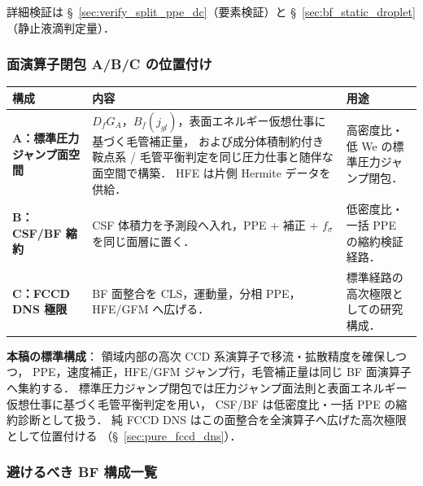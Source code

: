 詳細検証は §~\ref{sec:verify_split_ppe_dc}（要素検証）と
§~\ref{sec:bf_static_droplet}（静止液滴判定量）．

\subsubsection{面演算子閉包 A/B/C の位置付け}
\label{sec:fccd_bf_strategy_table}

\begin{center}
\begin{tabular}{@{}p{}p{}p{}@{}}
\hline
構成 & 内容 & 用途 \\
\hline
\textbf{A：標準圧力ジャンプ面空間} &
$D_fG_A$，$B_f(j_{gl})$，表面エネルギー仮想仕事に基づく毛管補正量，
および成分体積制約付き鞍点系 / 毛管平衡判定を同じ圧力仕事と随伴な面空間で構築．
HFE は片側 Hermite データを供給．
& 高密度比・低 We の標準圧力ジャンプ閉包．
\\
\textbf{B：CSF/BF 縮約} &
CSF 体積力を予測段へ入れ，PPE + 補正 + $f_\sigma$ を同じ面層に置く．
& 低密度比・一括 PPE の縮約検証経路．
\\
\textbf{C：FCCD DNS 極限} &
BF 面整合を CLS，運動量，分相 PPE，HFE/GFM へ広げる．
& 標準経路の高次極限としての研究構成．
\\
\hline
\end{tabular}
\end{center}

\noindent\textbf{本稿の標準構成}：
領域内部の高次 CCD 系演算子で移流・拡散精度を確保しつつ，
PPE，速度補正，HFE/GFM ジャンプ行，毛管補正量は同じ BF 面演算子へ集約する．
標準圧力ジャンプ閉包では圧力ジャンプ面法則と表面エネルギー仮想仕事に基づく毛管平衡判定を用い，
CSF/BF は低密度比・一括 PPE の縮約診断として扱う．
純 FCCD DNS はこの面整合を全演算子へ広げた高次極限として位置付ける
（§~\ref{sec:pure_fccd_dns}）．

\subsubsection{避けるべき BF 構成一覧}
\label{sec:fccd_bf_anti_patterns}

